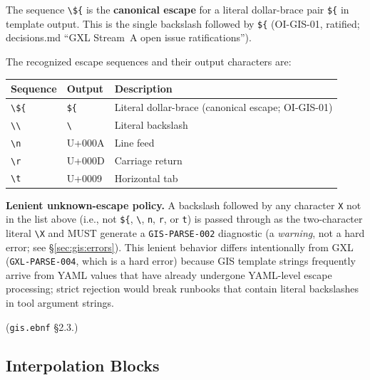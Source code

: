 The sequence \texttt{\textbackslash\$\{} is the \textbf{canonical escape}
for a literal dollar-brace pair \texttt{\$\{} in template output.
This is the single backslash followed by \texttt{\$\{} (OI-GIS-01, ratified;
decisions.md ``GXL Stream~A open issue ratifications'').

\noindent The recognized escape sequences and their output characters are:

\begin{center}
\begin{tabular}{lll}
\hline
\textbf{Sequence} & \textbf{Output} & \textbf{Description} \\
\hline
\texttt{\textbackslash\$\{} & \texttt{\$\{}        & Literal dollar-brace (canonical escape; OI-GIS-01) \\
\texttt{\textbackslash\textbackslash} & \texttt{\textbackslash} & Literal backslash \\
\texttt{\textbackslash n}            & U+000A              & Line feed \\
\texttt{\textbackslash r}            & U+000D              & Carriage return \\
\texttt{\textbackslash t}            & U+0009              & Horizontal tab \\
\hline
\end{tabular}
\end{center}

\noindent\textbf{Lenient unknown-escape policy.}
A backslash followed by any character \texttt{X} not in the list above
(i.e., not \texttt{\$\{}, \texttt{\textbackslash}, \texttt{n}, \texttt{r},
or \texttt{t}) is passed through as the two-character literal
\texttt{\textbackslash X} and MUST generate a \texttt{GIS-PARSE-002}
diagnostic (a \emph{warning}, not a hard error; see \S\ref{sec:gis:errors}).
This lenient behavior differs intentionally from GXL
(\texttt{GXL-PARSE-004}, which is a hard error) because GIS template
strings frequently arrive from YAML values that have already undergone
YAML-level escape processing; strict rejection would break runbooks that
contain literal backslashes in tool argument strings.

(\texttt{gis.ebnf} \S2.3.)

\subsection{Interpolation Blocks}
\label{subsec:gis:interpolation}

